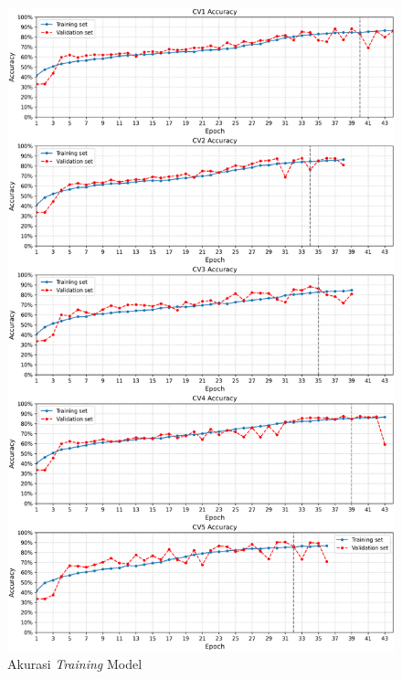            \begin{figure}[H]
              \centering
             \includegraphics[width= 1.0\linewidth]{figures/bab4/akurasi_plotfix.png}
              \caption{Akurasi \textit{Training} Model}
              \label{Akurasi Training Model Terbaik}
          \end{figure}

